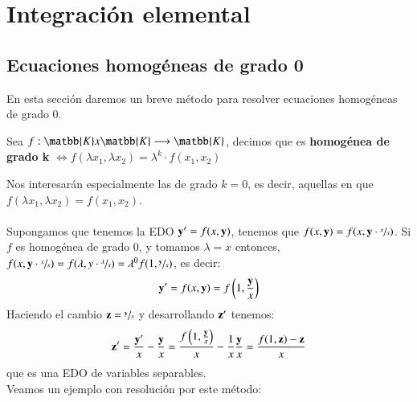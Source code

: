 
\chapter{Integraci\'{o}n elemental}
\section{Ecuaciones homog\'{e}neas de grado 0}
En esta sección daremos un breve método para resolver ecuaciones homogéneas de grado $0$.
\begin{dfn}
    Sea $f: \matbb{K} x \matbb{K} \longrightarrow \matbb{K}$, decimos que es \textbf{homogénea de grado k} $\iff f(\lambda x_1, \lambda x_2) = \lambda^k \cdot f(x_1, x_2)$
\end{dfn}
Nos interesarán especialmente las de grado $k=0$, es decir, aquellas en que $f(\lambda x_1, \lambda x_2) = f(x_1, x_2)$.\\\\
Supongamos que tenemos la EDO $\mathbf{y'} = f(x, \mathbf{y})$, tenemos que $f(x, \mathbf{y}) = f(x, \mathbf{y} \cdot \sfrac{x}{x})$. Si $f$ es homogénea de grado 0, y tomamos $\lambda = x$ entonces, $f(x, \mathbf{y} \cdot \sfrac{x}{x}) = f(\lambda, y \cdot \sfrac{\lambda}{x}) = \lambda^0 f(1, \sfrac{\mathbf{y}}{x})$, es decir:
$$
    \mathbf{y}' = f(x,\mathbf{y}) = f\left(1, \frac{\mathbf{y}}{x}\right)
$$
Haciendo el cambio $\mathbf{z} = \sfrac{\mathbf{y}}{x}$ y desarrollando $\mathbf{z'}$ tenemos:
$$
    \mathbf{z'} = \frac{\mathbf{y'}}{x} - \frac{\mathbf{y}}{x} = \frac{f\left(1,\frac{\mathbf{y}}{x}\right)}{x} - \frac{1}{x} \frac{\mathbf{y}}{x} = \frac{f(1,\mathbf{z}) - \mathbf{z}}{x}
$$
que es una EDO de variables separables.\\Veamos un ejemplo con resolución por este método:
